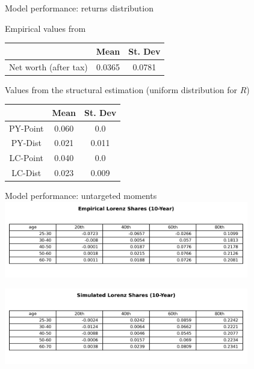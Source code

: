 \documentclass{beamer}
\begin{document}

\begin{frame}{Model performance: returns distribution}
\centering

\begin{flushleft}
\par Empirical values from \cite{aflgdmlp20}
\end{flushleft}
    \begin{tabular}{|c|c|c|}
\hline
& Mean & St. Dev \\
\hline
Net worth (after tax) & 0.0365 & 0.0781  \\
\hline
\end{tabular}

\begin{flushleft}
\par Values from the structural estimation (uniform distribution for $R$)
\end{flushleft}
    \begin{tabular}{|c|c|c|}
\hline
& Mean & St. Dev \\
\hline
PY-Point & 0.060 & 0.0  \\
PY-Dist & 0.021  &  0.011  \\
LC-Point & 0.040 & 0.0  \\
LC-Dist & 0.023  &  0.009  \\
\hline
\end{tabular}

\end{frame}

\begin{frame}{Model performance: untargeted moments}
\centering
\includegraphics[width=0.8\textwidth]{Tables/Emp_Lorenz_10yr_LCrrDistNetWorth.png}


\includegraphics[width=0.8\textwidth]{Tables/Sim_Lorenz_10yr_LCrrDistNetWorth.png}

\end{frame}
\end{document}
